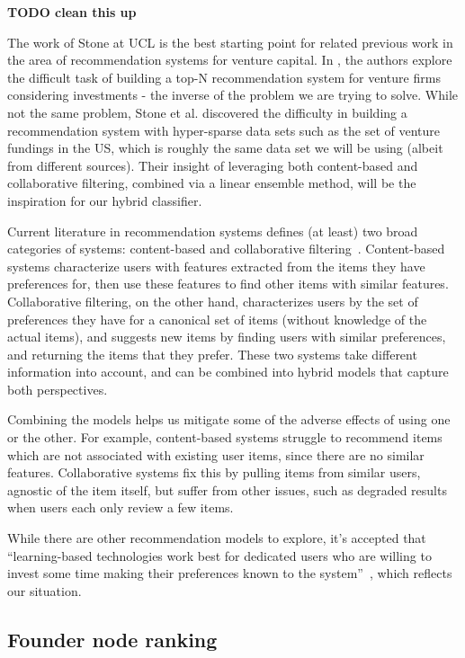 \textbf{TODO clean this up}

The work of Stone at UCL is the best starting point for related previous work in the area of recommendation systems for venture capital. In \cite{Stone:2013:EST:2541167.2507882}, the authors explore the difficult task of building a top-N recommendation system for venture firms considering investments - the inverse of the problem we are trying to solve. While not the same problem, Stone et al. discovered the difficulty in building a recommendation system with hyper-sparse data sets such as the set of venture fundings in the US, which is roughly the same data set we will be using (albeit from different sources). Their insight of leveraging both content-based and collaborative filtering, combined via a linear ensemble method, will be the inspiration for our hybrid classifier.

Current literature in recommendation systems defines (at least) two broad categories of systems: content-based and collaborative filtering~\cite{Burke2002}. Content-based systems characterize users with features extracted from the items they have preferences for, then use these features to find other items with similar features. Collaborative filtering, on the other hand, characterizes users by the set of preferences they have for a canonical set of items (without knowledge of the actual items), and suggests new items by finding users with similar preferences, and returning the items that they prefer. These two systems take different information into account, and can be combined into hybrid models that capture both perspectives.

Combining the models helps us mitigate some of the adverse effects of using one or the other. For example, content-based systems struggle to recommend items which are not associated with existing user items, since there are no similar features. Collaborative systems fix this by pulling items from similar users, agnostic of the item itself, but suffer from other issues, such as degraded results when users each only review a few items.

While there are other recommendation models to explore, it's accepted that ``learning-based technologies work best for dedicated users who are willing to invest some time making their preferences known to the system''~\cite{Burke2002}, which reflects our situation.

\subsection{Founder node ranking}

